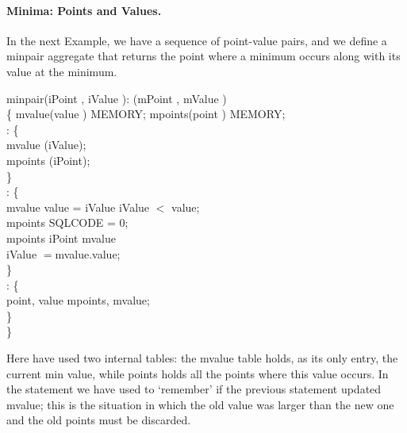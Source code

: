 \paragraph{Minima: Points and Values.} In the next Example, we have
a sequence of point-value pairs, and
we  define a {\bw minpair} aggregate
that returns the point where a minimum occurs
along with its value at the minimum.


\begin{codedisplay}
 minpair(iPoint , iValue ): (mPoint , mValue )\\
 \{ \>   mvalue(value ) MEMORY;
  mpoints(point ) MEMORY; \\
\>: \{ \\
\>\>   mvalue  (iValue);\\
\>\>   mpoints (iPoint);\\
\> \} \\
\>: \{\\
\>\>  mvalue  value = iValue  iValue $<$ value;\\
\>\>  mpoints  SQLCODE = 0;\\
 \>\>  mpoints  iPoint  mvalue\\
 \>\>\> \>\>\>\>\>\>\>\>  iValue $=$mvalue.value;\\
\> \} \>\>\>\>\>\>\>\>\\
%
\>: \{ \\
\>\>    point, value  mpoints, mvalue;\\
\> \}  \\
\}\\
\end{codedisplay}

Here have used two internal tables: the {\bw mvalue} table holds, as its only entry,
the current min value, while {\bw points} holds all the points where this
value occurs.
In the {\small {}} statement we have used {}
to `remember' if the previous statement updated {\bw mvalue}; this is the situation in which
the old value was larger than the new one and the old points
must be discarded.

